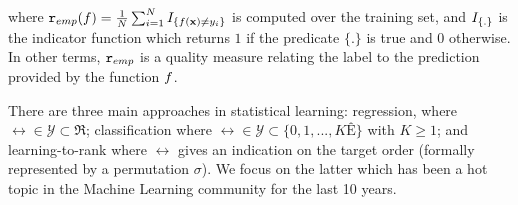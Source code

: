 \noindent
where ${\tt r}_{emp}(f) = \frac{1}{N} \sum_{i=1}^N I_{\left \{ f({\bf x}) \neq y_i \right \}}$ is computed over the training set, and $I_{\left \{ . \right \}}$ is the indicator function which returns $1$ if the predicate $\{.\}$ is true and $0$ otherwise. In other terms, ${\tt r}_{emp}$ is a quality measure relating the label to the prediction provided by the function $f$.

There are three main approaches in statistical learning: regression, where $\rel \in \mathcal{Y}  \subset \Re$; classification where $\rel \in \mathcal{Y}  \subset \{0,1, ..., KÊ\}$ with $K \geq 1$; and learning-to-rank where $\rel$ gives an indication on the target order (formally represented by a permutation $\sigma$). We focus on the latter which has been a hot topic in the Machine Learning community for the last 10 years.

%
%
%
%


